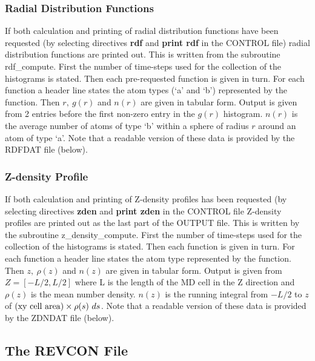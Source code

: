 \subsubsection{Radial Distribution Functions}

If both calculation and printing of radial distribution functions
have been requested (by selecting directives {\bf rdf} and {\bf
print rdf} in the CONTROL file) radial distribution functions are
printed out.  This is written from the subroutine {\sc
rdf\_compute}.  First the number of time-steps used for the
collection of the histograms is stated.  Then each pre-requested
function is given in turn.  For each function a header line states
the atom types (`a' and `b') represented by the function.  Then
$r,~g(r)$ and $n(r)$ are given in tabular form.  Output is given
from 2 entries before the first non-zero entry in the $g(r)$
histogram.  $n(r)$ is the average number of atoms of type `b' within
a sphere of radius $r$ around an atom of type `a'.
Note that a readable version of these data is provided by the
RDFDAT file (below).

\subsubsection{Z-density Profile}

If both calculation and printing of Z-density profiles has been
requested (by selecting directives {\bf zden} and {\bf print zden}
in the CONTROL file Z-density profiles are printed out as the last
part of the OUTPUT file.  This is written by the subroutine {\sc
z\_density\_compute}.  First the number of time-steps used for the
collection of the histograms is stated.  Then each function is given
in turn.  For each function a header line states the atom type
represented by the function.  Then $z,~\rho(z)$ and $n(z)$ are given
in tabular form. Output is given from $Z = [-L/2,L/2]$ where L is
the length of the MD cell in the Z direction and $\rho(z)$ is the
mean number density.  $n(z)$ is the running integral from $-L/2$ to
$z$ of $({\rm xy~cell~area}) \times \rho(s)~ds$.
Note that a readable version of these data is provided by the
ZDNDAT file (below).

\subsection{The REVCON File}
\label{revcon-file}

